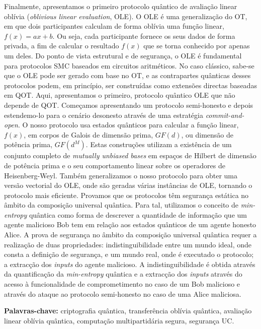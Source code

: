 \documentclass[12pt]{report}
\begin{document}
Finalmente, apresentamos o primeiro protocolo quântico de  avaliação linear oblívia (\textit{oblivious linear evaluation}, OLE). O OLE é uma generalização do OT, em que dois participantes calculam de forma oblívia uma função linear, $f(x) = ax + b$. Ou seja, cada participante fornece os seus dados de forma privada, a fim de calcular o resultado $f(x)$ que se torna conhecido por apenas um deles. Do ponto de vista estrutural e de segurança, o OLE é fundamental para protocolos SMC baseados em circuitos aritméticos. No caso clássico, sabe-se que o OLE pode ser gerado com base no OT, e as contrapartes quânticas desses protocolos podem, em princípio, ser construídas como extensões directas baseadas em QOT. Aqui, apresentamos o primeiro, protocolo quântico OLE que não depende de QOT. Começamos apresentando um protocolo semi-honesto e depois estendemo-lo para o cenário desonesto através de uma estratégia \textit{commit-and-open}. O nosso protocolo usa estados quânticos para calcular a função linear, $f(x)$, em corpos de Galois de dimensão prima, $GF(d)$, ou dimensão de potência prima, $GF(d^M)$. Estas construções utilizam a existência de um conjunto completo de \textit{mutually unbiased bases} em espaços de Hilbert de dimensão de potência prima e o seu comportamento linear sobre os operadores de Heisenberg-Weyl. Também generalizamos o nosso protocolo para obter uma versão vectorial do OLE, onde são geradas várias instâncias de OLE, tornando o protocolo mais eficiente. Provamos que os protocolos têm segurança estática no âmbito da composição universal quântica. Para tal, utilizamos o conceito de \textit{min-entropy} quântica como forma de descrever a quantidade de informação que um agente malicioso Bob tem em relação aos estados quânticos de um agente honesto Alice. A prova de segurança no âmbito da composição universal quântica requer a realização de duas propriedades: indistinguibilidade entre um mundo ideal, onde consta a definição de segurança, e um mundo real, onde é executado o protocolo; a extracção dos \textit{inputs} do agente malicioso. A indistinguibilidade é obtida através da quantificação da \textit{min-entropy} quântica e a extracção dos \textit{inputs} através do acesso à funcionalidade de comprometimento no caso de um Bob malicioso e através do ataque ao protocolo semi-honesto no caso de uma Alice maliciosa.


\vfill
\begin{flushleft}
\textbf{Palavras-chave:} criptografia qu\^{a}ntica, transferência oblívia quântica, avaliação linear oblívia quântica, computação multipartidária segura, segurança UC.
\end{flushleft}
\end{document}
